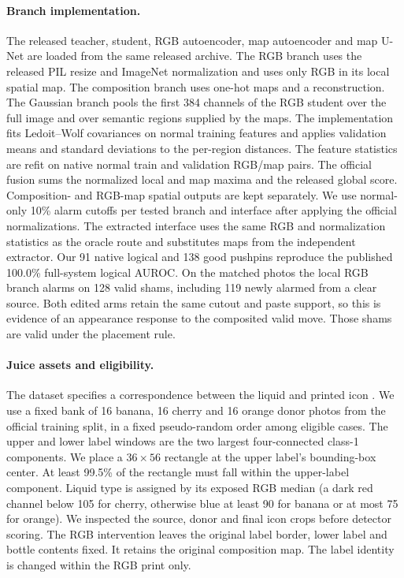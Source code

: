 \paragraph{Branch implementation.}
The released teacher, student, RGB autoencoder, map autoencoder and map U-Net are loaded from the same released archive. The RGB branch uses the released PIL resize and ImageNet normalization and uses only RGB in its local spatial map. The composition branch uses one-hot maps and a reconstruction. The Gaussian branch pools the first 384 channels of the RGB student over the full image and over semantic regions supplied by the maps. The implementation fits Ledoit--Wolf covariances on normal training features and applies validation means and standard deviations to the per-region distances. The feature statistics are refit on native normal train and validation RGB/map pairs. The official fusion sums the normalized local and map maxima and the released global score. Composition- and RGB-map spatial outputs are kept separately. We use normal-only 10\% alarm cutoffs per tested branch and interface after applying the official normalizations. The extracted interface uses the same RGB and normalization statistics as the oracle route and substitutes maps from the independent extractor. Our 91 native logical and 138 good pushpins reproduce the published 100.0\% full-system logical AUROC. On the matched photos the local RGB branch alarms on 128 valid shams, including 119 newly alarmed from a clear source. Both edited arms retain the same cutout and paste support, so this is evidence of an appearance response to the composited valid move. Those shams are valid under the placement rule.

\begin{table}[t]
\centering
\caption{Released SALAD with all branches on the matched pushpins. Strict normal-validation cutoffs, separately for each branch and interface. Wins give paired fault-over-sham direction with half ties. The global branch emits a scalar.}
\label{tab:fullpins}
\small

\end{table}

\paragraph{Juice assets and eligibility.}
The dataset specifies a correspondence between the liquid and printed icon \cite{bergmann2022}. We use a fixed bank of 16 banana, 16 cherry and 16 orange donor photos from the official training split, in a fixed pseudo-random order among eligible cases. The upper and lower label windows are the two largest four-connected class-1 components. We place a $36{\times}56$ rectangle at the upper label's bounding-box center. At least 99.5\% of the rectangle must fall within the upper-label component. Liquid type is assigned by its exposed RGB median (a dark red channel below 105 for cherry, otherwise blue at least 90 for banana or at most 75 for orange). We inspected the source, donor and final icon crops before detector scoring. The RGB intervention leaves the original label border, lower label and bottle contents fixed. It retains the original composition map. The label identity is changed within the RGB print only.

